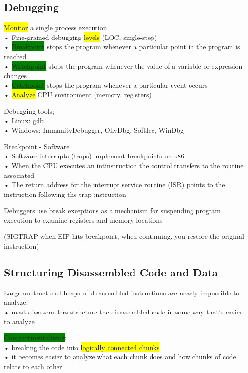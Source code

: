 \documentclass[]{project_plan}
\begin{document}
\subsection{Debugging}
\colorbox{yellow}{Monitor} a single process execution\\
• Fine-grained debugging \colorbox{yellow}{levels} (LOC, single-step)\\
• \colorbox{green}{Breakpoint} stops the program whenever a particular point in the program is
reached\\
• \colorbox{green}{Watchpoint} stops the program whenever the value of a variable or expression
changes\\
• \colorbox{green}{Catchpoint} stops the program whenever a particular event occurs\\
• \colorbox{yellow}{Analyze} CPU environment (memory, registers)

Debugging tools;\\
• Linux: gdb\\
• Windows: ImmunityDebugger, OllyDbg, SoftIce, WinDbg

Breakpoint - Software\\
• Software interrupts (traps) implement breakpoints on x86\\
• When the CPU executes an intinstruction the control transfers to the routine
associated\\
• The return address for the interrupt service routine (ISR) points to the instruction
following the trap instruction

Debuggers use break exceptions as a mechanism for suspending program
execution to examine registers and memory locations

(SIGTRAP when EIP hits breakpoint, when continuing, you restore the original instruction)

\subsection{Structuring Disassembled Code and Data}

Large unstructured heaps of disassembled instructions are nearly impossible to
analyze:\\
• most disassemblers structure the disassembled code in some way that’s easier to
analyze

\colorbox{green}{Compartmentalizing}:\\
• breaking the code into \colorbox{yellow}{logically connected chunks}\\
• it becomes easier to analyze what each chunk does and how chunks of code relate to each
other
\end{document}
